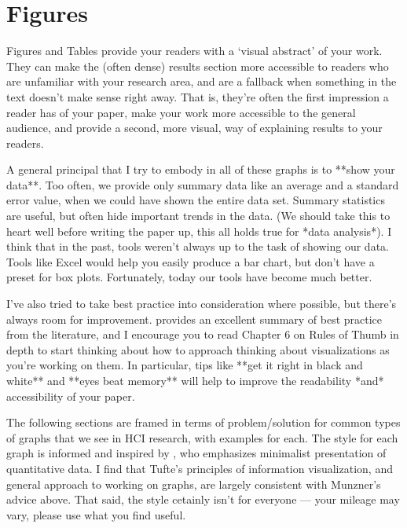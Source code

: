 \newpage

%
%


\section{Figures}

\begin{markdown}
Figures and Tables provide your readers with a `visual abstract' of your work. They can make the (often dense) results section more accessible to readers who are unfamiliar with your research area, and are a fallback when something in the text doesn't make sense right away. That is, they're often the first impression a reader has of your paper, make your work more accessible to the general audience, and provide a second, more visual, way of explaining results to your readers.

A general principal that I try to embody in all of these graphs is to **show your data**. Too often, we provide only summary data like an average and a standard error value, when we could have shown the entire data set. Summary statistics are useful, but often hide important trends in the data. (We should take this to heart well before writing the paper up, this all holds true for *data analysis*). I think that in the past, tools weren't always up to the task of showing our data. Tools like Excel would help you easily produce a bar chart, but don't have a preset for box plots. Fortunately, today our tools have become much better. 

I've also tried to take best practice into consideration where possible, but there's always room for improvement. \citet{munznervisualization} provides an excellent summary of best practice from the literature, and I encourage you to read Chapter 6 on Rules of Thumb in depth to start thinking about how to approach thinking about visualizations as you're working on them. In particular, tips like **get it right in black and white** and **eyes beat memory** will help to improve the readability *and* accessibility of your paper. 

The following sections are framed in terms of problem/solution for common types of graphs that we see in HCI research, with examples for each. The style for each graph is informed and inspired by \citet{tufte1983visual}, who emphasizes minimalist presentation of quantitative data. I find that Tufte's principles of information visualization, and general approach to working on graphs, are largely consistent with Munzner's advice above. That said, the style cetainly isn't for everyone --- your mileage may vary, please use what you find useful.  


 \end{markdown}
 
